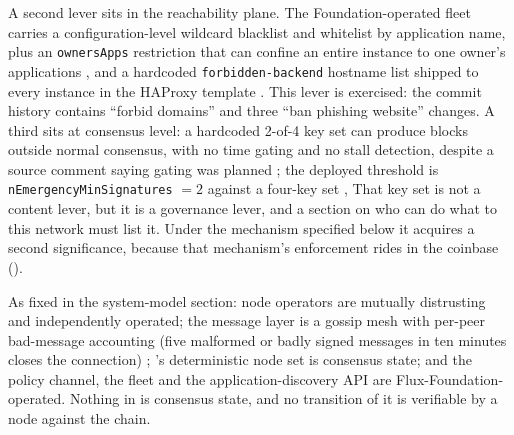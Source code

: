 A second lever sits in the reachability plane. The Foundation-operated \FDM{} fleet carries a
configuration-level wildcard blacklist and whitelist by application name, plus an
\texttt{ownersApps} restriction that can confine an entire \FDM{} instance to one owner's
applications 
, and a hardcoded
\texttt{forbidden-\allowbreak{}backend} hostname list shipped to every \FDM{} instance in the HAProxy template
. This lever is exercised:
the commit history contains ``forbid domains'' and three ``ban phishing website'' changes. A third
sits at consensus level: a hardcoded 2-of-4 key set can produce blocks outside normal consensus,
with no time gating and no stall detection, despite a source comment saying gating was planned
; the deployed threshold is
\texttt{n\allowbreak{}Emergency\allowbreak{}Min\allowbreak{}Signatures} $=2$ against a four-key set
,  That key set is not a
content lever, but it is a governance lever, and a section on who
can do what to this network must list it. Under the mechanism specified below it acquires a second
significance, because that mechanism's enforcement rides in the coinbase
().

\begin{assumption}
\label{ass:23:today}
As fixed in the system-model section: node operators are mutually distrusting and independently
operated; the \FluxOS{} message layer is a gossip mesh with per-peer bad-message accounting
(five malformed or badly signed messages in ten minutes closes the connection)
; \fluxd's deterministic node set
is consensus state; and the policy channel, the \FDM{} fleet and the application-discovery API are
Flux-Foundation-operated. Nothing in  is consensus state, and no
transition of it is verifiable by a node against the chain.
\end{assumption}

